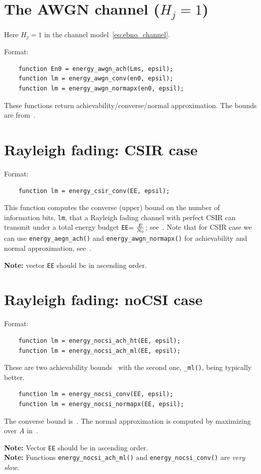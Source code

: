 \documentclass[a4paper,11p]{memoir}
\begin{document}
\section{The AWGN channel ($H_j=1$)}

Here $H_j=1$ in the channel model~\eqref{eq:ebno_channel}.

Format:
\begin{verbatim}
	function En0 = energy_awgn_ach(Lms, epsil);
	function lm = energy_awgn_conv(en0, epsil);
	function lm = energy_awgn_normapx(en0, epsil);
\end{verbatim}

These functions return achievability/converse/normal approximation. The bounds are from~\cite[Theorems 2 and 3]{PPV10eneff}.

\section{Rayleigh fading: CSIR case}

Format:
\begin{verbatim}
	function lm = energy_csir_conv(EE, epsil);
\end{verbatim}

This function computes the converse (upper) bound on the number of information bits, \verb|lm|, that a Rayleigh fading
channel with perfect CSIR can transmit under a total energy budget \verb|EE|$={E\over N_0}$; see~\cite[Theorem
11]{YDP15}. Note that for CSIR case we can use \verb|energy_aegn_ach()| and \verb|energy_awgn_normapx()| for
achievability and normal approximation, see~\cite[Section III.D]{YDP15}.

\medskip
\textbf{Note:} vector \verb|EE| should be in ascending order.

\section{Rayleigh fading: noCSI case}

Format:
\begin{verbatim}
	function lm = energy_nocsi_ach_ht(EE, epsil);
	function lm = energy_nocsi_ach_ml(EE, epsil);
\end{verbatim}

	These are two achievability bounds~\cite[Corollary 4 and 5]{YDP15} with the second one, \verb|_ml()|, being
	typically better.

\begin{verbatim}
	function lm = energy_nocsi_conv(EE, epsil);
	function lm = energy_nocsi_normapx(EE, epsil);
\end{verbatim}

	The converse bound is~\cite[Theorem 6]{YDP15}. The normal approximation is computed by maximizing over $A$
	in~\cite[(64)]{YDP15}.

\medskip
\noindent\textbf{Note:} Vector \verb|EE| should be in ascending order.\\
\textbf{Note:} Functions \verb|energy_nocsi_ach_ml()| and \verb|energy_nocsi_conv()| are \textit{very slow}. 





\end{document}
